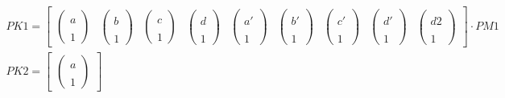 \begin{gather}		
PK1 =		
\begin{bmatrix}
\begin{pmatrix}
\\a\\\\1
\end{pmatrix}&
\begin{pmatrix}
\\b\\\\1
\end{pmatrix}&
\begin{pmatrix}
\\c\\\\1
\end{pmatrix}&
\begin{pmatrix}
\\d\\\\1
\end{pmatrix}&
\begin{pmatrix}
\\a'\\\\1
\end{pmatrix}&
\begin{pmatrix}
\\b'\\\\1
\end{pmatrix}&
\begin{pmatrix}
\\c'\\\\1
\end{pmatrix}&
\begin{pmatrix}
\\d'\\\\1
\end{pmatrix}&
\begin{pmatrix}
\\d2\\\\1
\end{pmatrix}
\end{bmatrix}
\cdot
PM1\\
PK2 =		
\begin{bmatrix}
\begin{pmatrix}
\\a\\\\1

\end{pmatrix}
\end{bmatrix}
\end{gather}
